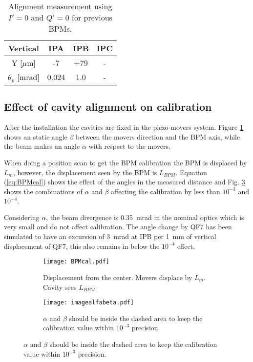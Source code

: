 \begin{table}[h]
\centering
 \begin{tabular}{c||c|c|c}\hline
 Vertical & IPA &IPB & IPC \\\hline\hline
 Y [$\mu$m] & -7 & +79 & - \\
 $\theta_p$ [mrad] & 0.024 & 1.0& -\\\hline
 \end{tabular}\caption{Alignment measurement using $I'=0$ and $Q'=0$ for previous BPMs.}\label{t:oldbpms}
\end{table}
\subsection{Effect of cavity alignment on calibration}
After the installation the cavities are fixed in the piezo-movers system. Figure \ref{f-BPMcal} shows an static angle $\beta$ between the movers direction and the BPM axis, while the beam makes an angle $\alpha$ with respect to the movers.\par
When doing a position scan to get the BPM calibration the BPM is displaced by $L_m$, however, the displacement seen by the BPM is $L_{BPM}$. Equation (\ref{eq:BPMcal}) shows the effect of the angles in the measured distance and Fig. \ref{f-imagealfabeta} shows the combinations of $\alpha$ and $\beta$ affecting the calibration by less than $10^{-3}$ and $10^{-4}$.\par
Considering $\alpha$, the beam divergence is 0.35~mrad in the nominal optics which is very small and do not affect calibration. The angle change by QF7 has been simulated to have an excursion of 3~mrad at IPB per 1~mm of vertical displacement of QF7, this also remains in below the $10^{-4}$ effect.\par
\begin{figure}[htb]
\centering\hspace*{0.6cm}
\begin{subfigure}{0.4\textwidth}
  \texttt{[image: BPMcal.pdf]}\caption{Displacement from the center. Movers displace by $L_m$. Cavity sees $L_{BPM}$}\label{f-BPMcal}
 \end{subfigure}\hspace*{0.5cm}
 \begin{subfigure}{0.4\textwidth}
  \texttt{[image: imagealfabeta.pdf]}\caption{$\alpha$ and $\beta$ should be inside the dashed area to keep the calibration value within $10^{-3}$ precision.}\label{f-imagealfabeta}
 \end{subfigure}
\end{figure}
